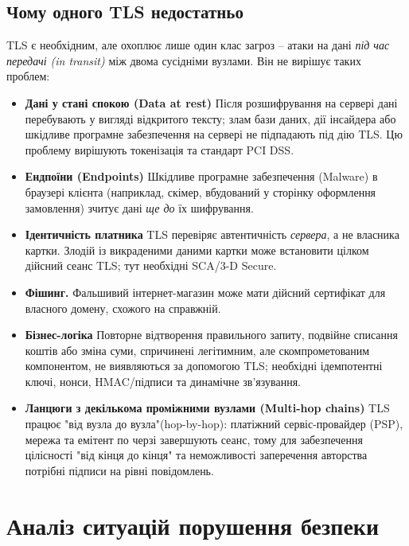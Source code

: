 \subsection*{Чому одного TLS недостатньо}
\label{sec:tls-not-enough}
TLS є необхідним, але охоплює лише один клас загроз -- атаки на дані \textit{під час передачі (in transit)} між 
двома сусідніми вузлами. Він не вирішує таких проблем:
\begin{itemize}[noitemsep]
    \item \textbf{Дані у стані спокою (Data at rest)} Після розшифрування на сервері дані перебувають у вигляді 
        відкритого тексту; злам бази даних, дії інсайдера або шкідливе програмне забезпечення на сервері не 
        підпадають під дію TLS. Цю проблему вирішують токенізація та стандарт PCI DSS.
    \item \textbf{Ендпоїни (Endpoints)} Шкідливе програмне забезпечення (Malware) в браузері клієнта (наприклад, 
        скімер, вбудований у сторінку оформлення замовлення) зчитує дані \textit{ще до} їх шифрування.
    \item \textbf{Ідентичність платника} TLS перевіряє автентичність \emph{сервера}, а не власника картки. Злодій 
        із викраденими даними картки може встановити цілком дійсний сеанс TLS; тут необхідні SCA/3-D Secure.
    \item \textbf{Фішинг.} Фальшивий інтернет-магазин може мати дійсний сертифікат для власного домену, схожого 
        на справжній.
    \item \textbf{Бізнес-логіка} Повторне відтворення правильного запиту, подвійне списання коштів або зміна 
        суми, спричинені легітимним, але скомпрометованим компонентом, не виявляються за допомогою TLS; необхідні 
        ідемпотентні ключі, нонси, HMAC/підписи та динамічне зв'язування.
    \item \textbf{Ланцюги з декількома проміжними вузлами (Multi-hop chains)} TLS працює "від вузла до вузла"{}(hop-by-hop): 
        платіжний сервіс-провайдер (PSP), мережа та емітент по черзі завершують сеанс, тому для забезпечення цілісності 
        "від кінця до кінця"{} та неможливості заперечення авторства потрібні підписи на рівні повідомлень.
\end{itemize}

\section{Аналіз ситуацій порушення безпеки}
\label{sec:situations}


